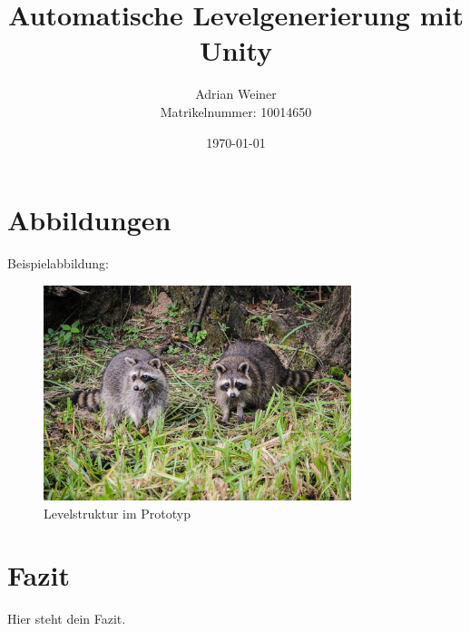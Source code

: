 \documentclass[12pt,a4paper]{article}
\title{Automatische Levelgenerierung mit Unity}
\author{Adrian Weiner \\ Matrikelnummer: 10014650}
\date{\today}
\begin{document}
\maketitle

\tableofcontents
\newpage



\section{Abbildungen}
Beispielabbildung:

\begin{figure}[h]
    \centering
    \includegraphics[width=0.8\textwidth]{bilder/beispielbild.png}
    \caption{Levelstruktur im Prototyp}
\end{figure}

\section{Fazit}
Hier steht dein Fazit.

\printbibliography
\end{document}
